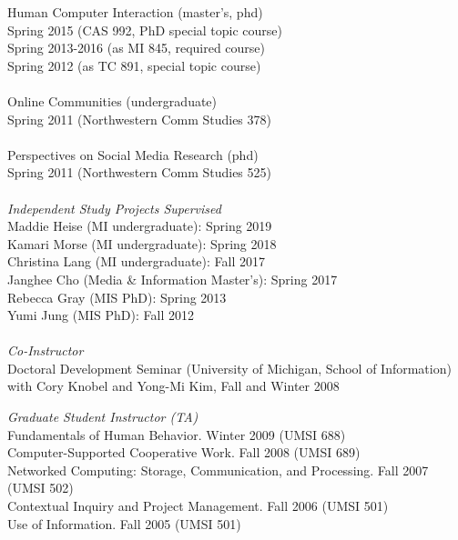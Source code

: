\documentclass[9pt]{extarticle}
\begin{document}
\begin{tabbing}
Human Computer Interaction (master's, phd) \\
\hspace{0.5cm} Spring 2015 (CAS 992, PhD special topic course) \\
\hspace{0.5cm} Spring 2013-2016 (as MI 845, required course) \\
\hspace{0.5cm} Spring 2012 (as TC 891, special topic course) \\\\

Online Communities (undergraduate) \\
\hspace{0.5cm} Spring 2011 (Northwestern Comm Studies 378) \\\\

Perspectives on Social Media Research (phd)\\
\hspace{0.5cm} Spring 2011 (Northwestern Comm Studies 525) \\\\ 

\emph{Independent Study Projects Supervised} \\[1pt]
Maddie Heise (MI undergraduate): Spring 2019 \\
Kamari Morse (MI undergraduate): Spring 2018 \\
Christina Lang (MI undergraduate): Fall 2017 \\
Janghee Cho (Media \& Information Master's): Spring 2017 \\
Rebecca Gray (MIS PhD): Spring 2013 \\
Yumi Jung (MIS PhD): Fall 2012 \\\\

\emph{Co-Instructor} \\[1pt]
Doctoral Development Seminar (University of Michigan, School of Information) \\
\hspace{0.5cm} with Cory Knobel and Yong-Mi Kim, Fall and Winter 2008 
\end{tabbing}

\begin{tabbing}
\emph{Graduate Student Instructor (TA)} \\
Fundamentals of Human Behavior. Winter 2009 (UMSI 688) \\
Computer-Supported Cooperative Work. Fall 2008 (UMSI 689) \\ 
Networked Computing: Storage, Communication, and Processing. Fall 2007 (UMSI 502) \\
Contextual Inquiry and Project Management. Fall 2006 (UMSI 501) \\
Use of Information. Fall 2005 (UMSI 501) 
\end{tabbing}
\end{document}
